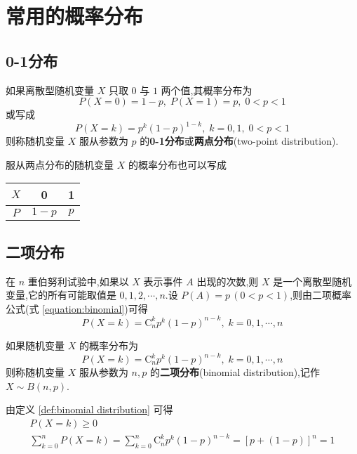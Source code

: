 \section{常用的概率分布}

\subsection{0-1分布}

\begin{definition}
    \indent 如果离散型随机变量 $X$ 只取 $0$ 与 $1$ 两个值,其概率分布为
    $$
    P(X=0)=1-p, \; P(X=1)=p, \; 0<p<1
    $$
    或写成
    $$
    P(X=k)=p^k (1-p)^{1-k}, \; k=0,1, \; 0<p<1
    $$
    则称随机变量 $X$ 服从参数为 $p$ 的\textbf{0-1分布}或\textbf{两点分布}(two-point distribution).
\end{definition}

服从两点分布的随机变量 $X$ 的概率分布也可以写成
\begin{table*}[htbp]
    \centering

    \begin{tabular}{c | c c}
        \hline
        $X$ & 0 & 1 \\
        \hline
        $P$ & $1-p$ & $p$ \\
        \hline
    \end{tabular}
\end{table*}

\subsection{二项分布}

在 $n$ 重伯努利试验中,如果以 $X$ 表示事件 $A$ 出现的次数,则 $X$ 是一个离散型随机变量,它的所有可能取值是 $0,1,2,\cdots,n$.设 $P(A)=p\,(0<p<1)$,则由二项概率公式(式 \eqref{equation:binomial})可得
$$
P(X=k)=\mathrm{C}_n^k p^k (1-p)^{n-k}, \; k=0,1,\cdots,n
$$

\begin{definition}
    \indent 如果随机变量 $X$ 的概率分布为
    $$
    P(X=k)=\mathrm{C}_n^k p^k (1-p)^{n-k}, \; k=0,1,\cdots,n
    $$
    则称随机变量 $X$ 服从参数为 $n,p$ 的\textbf{二项分布}(binomial distribution),记作 $X \sim B(n,p)$.
\end{definition}

由定义 \ref{def:binomial distribution} 可得
\begin{gather*}
    P(X=k) \geqslant 0\\
    \sum_{k=0}^n P(X=k) = \sum_{k=0}^n \mathrm{C}_n^k p^k (1-p)^{n-k} = [p+(1-p)]^n=1
\end{gather*}


